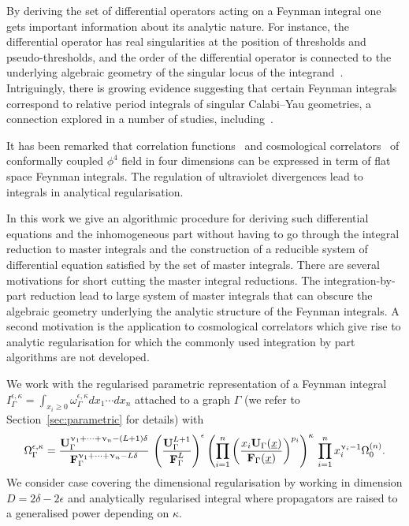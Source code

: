 \documentclass[a4paper,12pt]{article}
\numberwithin{equation}{section}
\numberwithin{figure}{section}
\begin{document}
\medskip
By deriving the set of differential operators acting on a Feynman integral one
gets important information about its analytic nature. For instance, 
the differential  operator has real singularities at the position of
 thresholds and pseudo-thresholds, and the order of the differential
operator is connected to the underlying algebraic geometry of the singular locus
of the integrand~\cite{Doran:2023yzu}. Intriguingly, there is  growing evidence suggesting that certain
Feynman integrals correspond to relative period integrals of singular
Calabi--Yau geometries, a connection explored in a number
of studies,
including~\cite{Brown:2009ta,Bloch:2014qca,Bloch:2016izu,Bourjaily:2018ycu,Bourjaily:2019hmc,Bourjaily:2018yfy,Klemm:2019dbm,Bonisch:2020qmm,Bonisch:2021yfw,Bourjaily:2022bwx,Forum:2022lpz,Duhr:2022pch,Frellesvig:2023PM}.

It has been remarked that correlation
functions~\cite{Heckelbacher:2022hbq}
and cosmological correlators~\cite{Heckelbacher:2022fbx,Chowdhury:2023arc}
of conformally
coupled $\phi^4$ field in four dimensions can be expressed in term of
flat space Feynman integrals.  The regulation of ultraviolet
divergences lead to integrals in analytical regularisation.

In this work we give an algorithmic procedure for deriving such
differential equations and the inhomogeneous part without having to go through the integral
reduction to master integrals and the construction of a reducible
system of differential equation satisfied by the set of master
integrals.  There are several motivations for short cutting the master
integral reductions. The integration-by-part reduction lead to large
system of master integrals that can obscure the algebraic
geometry underlying the analytic
structure of the Feynman integrals.
A second motivation is the application to
cosmological correlators which give rise to analytic regularisation
for which the commonly used integration by part algorithms are not  developed. 

We work with the regularised parametric representation of a Feynman integral $
I_\Gamma^{\epsilon,\kappa}=\int_{x_i\geq0}  \omega_\Gamma^{\epsilon,\kappa} dx_1\cdots dx_n$ attached to a
graph $\Gamma$ (we refer to 
Section~\ref{sec:parametric} for details)
with
\begin{equation}\label{e:OmegaAnRegIntro}
  \Omega^{\epsilon,\kappa}_\Gamma = { \textbf{U}_\Gamma ^{\upnu_1+\cdots+\upnu_n-(L+1)\delta}  \over \textbf{F}_\Gamma ^{\upnu_1+\cdots+\upnu_n-L\delta} }\, \left(\textbf{U}_\Gamma^{L+1}\over \textbf{F}_\Gamma^{L}\right)^{\epsilon} 
  \left(\prod_{i=1}^n \left(x_i \textbf{U}_\Gamma(\underline x)\over
      \textbf{F}_\Gamma(\underline x)\right)^{p_i}\right)^{\kappa} \, \prod_{i=1}^n x_i^{\upnu_i-1} \Omega^{(n)}_0.
\end{equation}
We consider case covering
the dimensional regularisation by working in dimension
$D=2\delta-2\epsilon$ and analytically regularised integral where
propagators are raised to a generalised power depending on $\kappa$.
\end{document}
